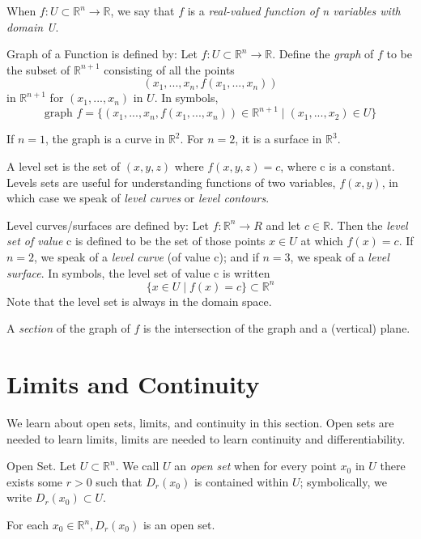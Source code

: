 \documentclass[12pt, letterpaper]{article}
\begin{document}
When \(f: U \subset \mathbb{R}^n \rightarrow \mathbb{R}\), we say that \(f\) is a \textit{real-valued function of n variables with domain U}.

Graph of a Function is defined by: Let \(f: U \subset \mathbb{R}^n \rightarrow \mathbb{R}\). Define the \textit{graph} of \(f\) to be the subset of \(\mathbb{R}^{n+1}\) consisting of all the points 
\[ 
(x_1,...,x_n,f(x_1,...,x_n))
\] 
in \(\mathbb{R}^{n+1}\) for \((x_1,...,x_n)\) in \(U\). In symbols,
\[ 
\text{graph }f = \{(x_1,...,x_n,f(x_1,...,x_n)) \in \mathbb{R}^{n+1} \mid (x_1,...,x_2) \in U\}
\] 

If \(n = 1\), the graph is a curve in \(\mathbb{R}^2\). For \(n = 2\), it is a surface in \(\mathbb{R}^3\).

A level set is the set of \((x,y,z)\) where \(f(x,y,z) = c\), where c is a constant. Levels sets are useful for understanding functions of two variables, \(f(x,y)\), in which case we speak of \textit{level curves} or \textit{level contours}.

Level curves/surfaces are defined by: Let \(f: \mathbb{R}^n \rightarrow R\) and let \(c \in \mathbb{R}\). Then the \textit{level set of value} c is defined to be the set of those points \(x \in U\) at which \(f(x) = c\). If \(n = 2\), we speak of a \textit{level curve} (of value c); and if \(n = 3\), we speak of a \textit{level surface}. In symbols, the level set of value c is written 
\[ 
\{x \in U \mid f(x) = c\} \subset \mathbb{R}^n
\] 
Note that the level set is always in the domain space.

A \textit{section} of the graph of \(f\) is the intersection of the graph and a (vertical) plane.

\section{Limits and Continuity}

We learn about open sets, limits, and continuity in this section. Open sets are needed to learn limits, limits are needed to learn continuity and differentiability.

Open Set. Let \(U \subset \mathbb{R}^n\). We call \(U\) an \textit{open set} when for every point \(x_0\) in \(U\) there exists some \(r>0\) such that \(D_r(x_0)\) is contained within \(U\); symbolically, we write \(D_r(x_0) \subset U\).

For each \(x_0 \in \mathbb{R}^n, D_r(x_0)\) is an open set.
\end{document}
